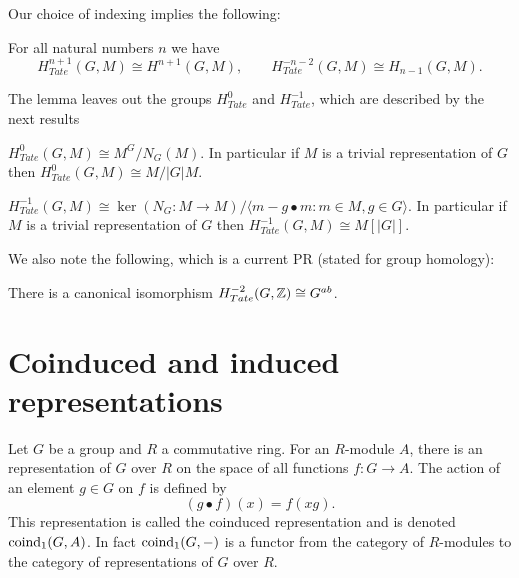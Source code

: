 Our choice of indexing implies the following:

\begin{lemma}
	For all natural numbers $n$ we have
	\[
		H^{n+1}_{Tate}(G,M) \cong H^{n+1} (G,M), \qquad
		H^{-n-2}_{Tate}(G,M) \cong H_{n-1} (G,M).
	\]
\end{lemma}

The lemma leaves out the groups $H^0_{Tate}$ and $H^{-1}_{Tate}$, which are described by the next
results

\begin{lemma}
	$H^0_{Tate}(G,M) \cong M^G / N_G(M)$.
	In particular if $M$ is a trivial representation of $G$ then
	$H^0_{Tate}(G,M) \cong M / |G|M$.
\end{lemma}

\begin{lemma}
	$H^{-1}_{Tate}(G,M) \cong \ker (N_G : M \to M ) /
	\langle {m - g \bullet m : m \in M, g \in G}\rangle$.
	In particular if $M$ is a trivial representation of $G$ then
	$H^{-1}_{Tate}(G,M) \cong M[|G|]$.
\end{lemma}

We also note the following, which is a current PR (stated for group homology):

\begin{lemma}
	There is a canonical isomorphism $H^{-2}_{Tate}(G,{\mathbb Z}) \cong G^{ab}$.
\end{lemma}


\section{Coinduced and induced representations}

\begin{definition}
	Let $G$ be a group and $R$ a commutative ring.
	For an $R$-module $A$, there is an representation of $G$ over $R$
	on the space of all functions $f : G \to A$. The action of an element $g \in G$ on $f$
	is defined by
	\[
		(g \bullet f) (x) = f(xg).
	\]
	This representation is called the coinduced representation and is denoted $\mathrm{coind}_1(G,A)$.
	In fact $\mathrm{coind}_1(G,-)$ is a functor from the category of $R$-modules to the category of
	representations
	of $G$ over $R$.
\end{definition}

